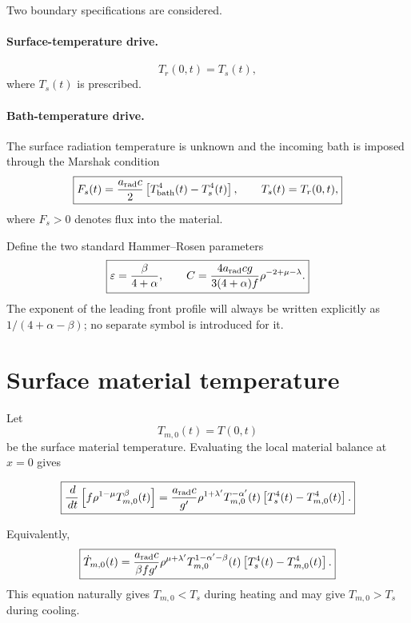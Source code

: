 \documentclass[11pt]{article}
\numberwithin{equation}{section}
\newcommand{\Ts}{T_s}
\newcommand{\Tb}{T_{\rm bath}}
\newcommand{\Tr}{T_r}
\newcommand{\Tm}{T_{m,0}}
\newcommand{\eps}{\varepsilon}
\newcommand{\arad}{a_{\rm rad}}
\newcommand{\dif}{\,d}
\begin{document}
Two boundary specifications are considered.

\paragraph{Surface-temperature drive.}
\begin{equation}
 \boxed{\Tr(0,t)=\Ts(t),}
 \label{eq:Ts_bc}
\end{equation}
where $\Ts(t)$ is prescribed.

\paragraph{Bath-temperature drive.}
The surface radiation temperature is unknown and the incoming bath is imposed
through the Marshak condition
\begin{equation}
 \boxed{
 F_s(t)=\frac{\arad c}{2}
 \left[\Tb^4(t)-\Ts^4(t)\right],
 \qquad \Ts(t)=\Tr(0,t),}
 \label{eq:marshak_bc}
\end{equation}
where $F_s>0$ denotes flux into the material.

Define the two standard Hammer--Rosen parameters
\begin{equation}
 \boxed{
 \eps=\frac{\beta}{4+\alpha},
 \qquad
 C=\frac{4\arad c g}{3(4+\alpha)f}
 \rho^{-2+\mu-\lambda}.}
 \label{eq:eps_C}
\end{equation}
The exponent of the leading front profile will always be written explicitly as
$1/(4+\alpha-\beta)$; no separate symbol is introduced for it.

\section{Surface material temperature}

Let
\begin{equation}
 \boxed{\Tm(t)=T(0,t)}
 \label{eq:Tm_def}
\end{equation}
be the surface material temperature.  Evaluating the local material balance at
$x=0$ gives
\begin{resultbox}
\begin{equation}
 \boxed{
 \frac{\dif}{\dif t}
 \left[f\rho^{1-\mu}\Tm^\beta(t)\right]
 =\frac{\arad c}{g'}\rho^{1+\lambda'}
 \Tm^{-\alpha'}(t)
 \left[\Ts^4(t)-\Tm^4(t)\right].}
 \label{eq:surface_material_ode}
\end{equation}
\end{resultbox}
Equivalently,
\begin{equation}
 \boxed{
 \dot\Tm(t)
 =\frac{\arad c}{\beta f g'}\rho^{\mu+\lambda'}
 \Tm^{1-\alpha'-\beta}(t)
 \left[\Ts^4(t)-\Tm^4(t)\right].}
 \label{eq:surface_material_ode_T}
\end{equation}
This equation naturally gives $\Tm<\Ts$ during heating and may give
$\Tm>\Ts$ during cooling.
\end{document}
